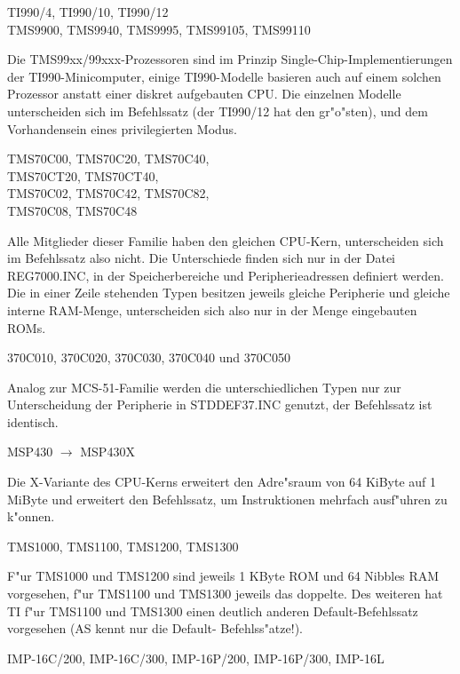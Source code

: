 \documentclass[12pt,a4paper,twoside]{report}
\newcommand{\asname}{AS}
\begin{document}
\begin{cpulist}
   TI990/4, TI990/10, TI990/12 \\
\> TMS9900, TMS9940, TMS9995, TMS99105, TMS99110
\end{cpulist}
Die TMS99xx/99xxx-Prozessoren sind im Prinzip Single-Chip-Implementierungen
der TI990-Minicomputer, einige TI990-Modelle basieren auch auf einem solchen
Prozessor anstatt einer diskret aufgebauten CPU.  Die einzelnen Modelle
unterscheiden sich im Befehlssatz (der TI990/12 hat den gr"o"sten), und
dem Vorhandensein eines privilegierten Modus.
\begin{cpulist}
   TMS70C00, TMS70C20, TMS70C40, \\
\> TMS70CT20, TMS70CT40, \\
\> TMS70C02, TMS70C42, TMS70C82, \\
\> TMS70C08, TMS70C48 \\
\end{cpulist}
Alle Mitglieder dieser Familie haben den gleichen CPU-Kern,
unterscheiden sich im Befehlssatz also nicht.  Die Unterschiede
finden sich nur in der Datei REG7000.INC, in der Speicherbereiche
und Peripherieadressen definiert werden.  Die in einer Zeile
stehenden  Typen besitzen jeweils gleiche Peripherie und gleiche
interne RAM-Menge, unterscheiden sich also nur in der Menge
eingebauten ROMs.
\begin{cpulist}
   370C010, 370C020, 370C030, 370C040 und 370C050
\end{cpulist}
Analog zur MCS-51-Familie werden die unterschiedlichen Typen nur
zur Unterscheidung der Peripherie in STDDEF37.INC genutzt, der
Befehlssatz ist identisch.
\begin{cpulist}
   MSP430 $\rightarrow$ MSP430X
\end{cpulist}
Die X-Variante des CPU-Kerns erweitert den Adre"sraum von 64
KiByte auf 1 MiByte und erweitert den Befehlssatz, um
Instruktionen mehrfach ausf"uhren zu k"onnen.
\begin{cpulist}
   TMS1000, TMS1100, TMS1200, TMS1300
\end{cpulist}
F"ur TMS1000 und TMS1200 sind jeweils 1 KByte ROM und 64 Nibbles
RAM vorgesehen, f"ur TMS1100 und TMS1300 jeweils das doppelte.  Des
weiteren hat TI f"ur TMS1100 und TMS1300 einen deutlich anderen
Default-Befehlssatz vorgesehen (\asname{} kennt nur die Default-
Befehlss"atze!).
\begin{cpulist}
   IMP-16C/200, IMP-16C/300, IMP-16P/200, IMP-16P/300, IMP-16L
\end{cpulist}
\end{document}
